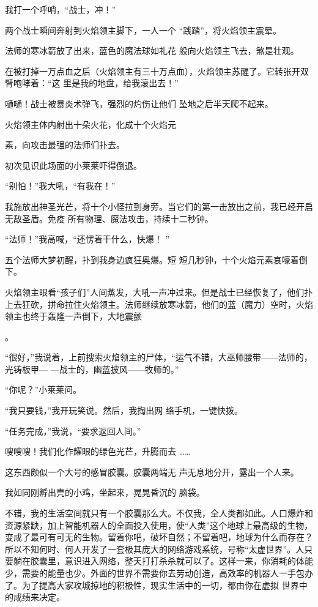 \documentclass{article}
\begin{document}
我打一个呼哨，“战士，冲！” 

两个战士瞬间奔射到火焰领主脚下，一人一个
“践踏”，将火焰领主震晕。 

法师的寒冰箭放了出来，蓝色的魔法球如礼花
般向火焰领主飞去，煞是壮观。 

在被打掉一万点血之后（火焰领主有三十万点血），火焰领主苏醒了。它转张开双臂咆哮着：“这
里是我的地盘，给我滚出去！” 

嗵嗵！战士被暴炎术弹飞，强烈的灼伤让他们
坠地之后半天爬不起来。 

火焰领主体内射出十朵火花，化成十个火焰元
\newpage

素，向攻击最强的法师们扑去。 


初次见识此场面的小莱莱吓得倒退。 


“别怕！”我大吼，“有我在！” 

我施放出神圣光芒，将十个小怪拉到身旁。当它们的第一击放出之前，我已经开启无敌圣盾。免疫
所有物理、魔法攻击，持续十二秒钟。 

“法师！”我高喊，“还愣着干什么，快爆！
” 

五个法师大梦初醒，扑到我身边疯狂奥爆。短
短几秒钟，十个火焰元素哀嚎着倒下。 

火焰领主眼看“孩子们”人间蒸发，大吼一声冲过来。但是战士已经恢复了，他们扑上去狂砍，拼命拉住火焰领主。法师继续放寒冰箭，他们的蓝（魔力）空时，火焰领主也终于轰隆一声倒下，大地震颤

\newpage
。 

“很好，”我说着，上前搜索火焰领主的尸体，“运气不错，大巫师腰带——法师的，光铸板甲—
—战士的，幽蓝披风——牧师的。” 


“你呢？”小莱莱问。 

“我只要钱，”我开玩笑说。然后，我掏出网
络手机，一键快拨。 


“任务完成，”我说，“要求返回人间。” 

嗖嗖嗖！我们化作耀眼的绿色光芒，升腾而去
…… 

这东西颇似一个大号的感冒胶囊。胶囊两端无
声无息地分开，露出一个人来。 

我如同刚孵出壳的小鸡，坐起来，晃晃昏沉的
脑袋。 

\newpage

不错，我的生活空间就只有一个胶囊那么大。不仅我，全人类都如此。人口爆炸和资源紧缺，加上智能机器人的全面投入使用，使“人类”这个地球上最高级的生物，变成了最可有可无的生物。留着你吧，破坏自然；不留着吧，地球为什么而存在？所以不知何时、何人开发了一套极其庞大的网络游戏系统，号称“太虚世界”。人只要躺在胶囊里，意识进入网络，整天打打杀杀就可以了。这样一来，你消耗的体能少，需要的能量也少。外面的世界不需要你去劳动创造，高效率的机器人一手包办了。为了提高大家攻城掠地的积极性，现实生活中的一切，都由你在虚拟
世界中的成绩来决定。 
\end{document}

